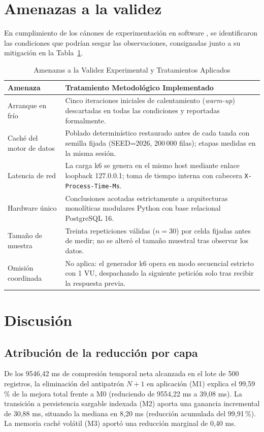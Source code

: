 \documentclass[conference]{IEEEtran}
\begin{document}
\section{Amenazas a la validez}

En cumplimiento de los cánones de experimentación en software \cite{Papadopoulos2021}, se identificaron las condiciones que podrían sesgar las observaciones, consignadas junto a su mitigación en la Tabla~\ref{tab:amenazas}.

\begin{table}[!ht]
\centering
\caption{Amenazas a la Validez Experimental y Tratamientos Aplicados}
\label{tab:amenazas}
\scriptsize
\setlength{\tabcolsep}{2.0pt}
\begin{tabularx}{\columnwidth}{|>{\raggedright\arraybackslash}p{2.3cm}|>{\raggedright\arraybackslash}X|}
\hline
\textbf{Amenaza} & \textbf{Tratamiento Metodológico Implementado} \\
\hline
Arranque en frío & Cinco iteraciones iniciales de calentamiento (\textit{warm-up}) descartadas en todas las condiciones y reportadas formalmente. \\
\hline
Caché del motor de datos & Poblado determinístico restaurado antes de cada tanda con semilla fijada (SEED=2026, 200\,000 filas); etapas medidas en la misma sesión. \\
\hline
Latencia de red & La carga k6 se genera en el mismo host mediante enlace loopback 127.0.0.1; toma de tiempo interna con cabecera \texttt{X-Process-Time-Ms}. \\
\hline
Hardware único & Conclusiones acotadas estrictamente a arquitecturas monolíticas modulares Python con base relacional PostgreSQL 16. \\
\hline
Tamaño de muestra & Treinta repeticiones válidas ($n=30$) por celda fijadas antes de medir; no se alteró el tamaño muestral tras observar los datos. \\
\hline
Omisión coordinada & No aplica: el generador k6 opera en modo secuencial estricto con 1 VU, despachando la siguiente petición solo tras recibir la respuesta previa. \\
\hline
\end{tabularx}
\end{table}

\section{Discusión}

\subsection{Atribución de la reducción por capa}
De los 9546,42 ms de compresión temporal neta alcanzada en el lote de 500 registros, la eliminación del antipatrón $N+1$ en aplicación (M1) explica el 99,59\,\% de la mejora total frente a M0 (reduciendo de 9554,22 ms a 39,08 ms). La transición a persistencia sargable indexada (M2) aporta una ganancia incremental de 30,88 ms, situando la mediana en 8,20 ms (reducción acumulada del 99,91\,\%). La memoria caché volátil (M3) aportó una reducción marginal de 0,40 ms.
\end{document}
